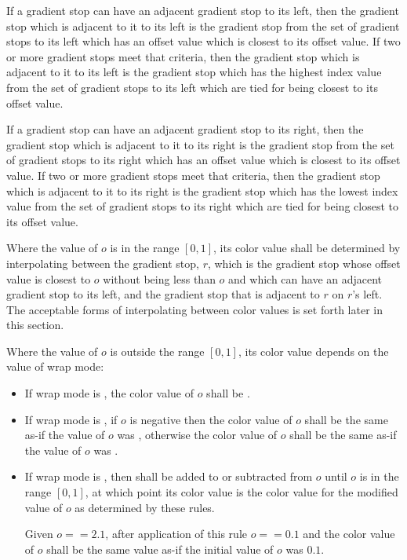 \begin{enumeratea}
\item If a gradient stop can have an adjacent gradient stop to its left, then the gradient stop which is adjacent to it to its left is the gradient stop from the set of gradient stops to its left which has an offset value which is closest to its offset value. If two or more gradient stops meet that criteria, then the gradient stop which is adjacent to it to its left is the gradient stop which has the highest index value from the set of gradient stops to its left which are tied for being closest to its offset value.

\item If a gradient stop can have an adjacent gradient stop to its right, then the gradient stop which is adjacent to it to its right is the gradient stop from the set of gradient stops to its right which has an offset value which is closest to its offset value. If two or more gradient stops meet that criteria, then the gradient stop which is adjacent to it to its right is the gradient stop which has the lowest index value from the set of gradient stops to its right which are tied for being closest to its offset value.

\item Where the value of $o$ is in the range $[0,1]$, its color value shall be determined by interpolating between the gradient stop, $r$, which is the gradient stop whose offset value is closest to $o$ without being less than $o$ and which can have an adjacent gradient stop to its left, and the gradient stop that is adjacent to $r$ on $r$'s left. The acceptable forms of interpolating between color values is set forth later in this section.

\item Where the value of $o$ is outside the range $[0,1]$, its color value depends on the value of wrap mode:
	\begin{itemize}
	\item If wrap mode is , the color value of $o$ shall be .
	
	\item If wrap mode is , if $o$ is negative then the color value of $o$ shall be the same as-if the value of $o$ was , otherwise the color value of $o$ shall be the same as-if the value of $o$ was .
	
	\item If wrap mode is , then  shall be added to or subtracted from $o$ until $o$ is in the range $[0,1]$, at which point its color value is the color value for the modified value of $o$ as determined by these rules.
	\begin{example}
	Given $o == 2.1$, after application of this rule $o == 0.1$ and the color value of $o$ shall be the same value as-if the initial value of $o$ was $0.1$.
	

\end{example}
\end{itemize}
\end{enumeratea}
